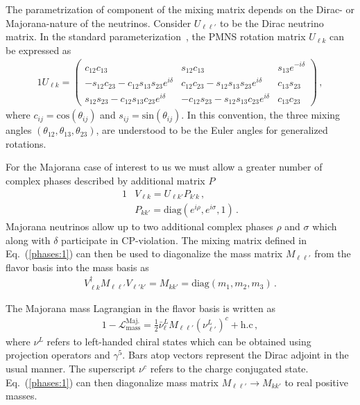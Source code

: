 \documentclass[addchapnum]{ws-rv961x669} %
\newcommand{\req}[1]{Eq.~(\ref{#1})}
\begin{document}
The parametrization of component of the mixing matrix depends on the Dirac- or Majorana-nature of the neutrinos.  Consider $U_{\ell\ell'}$ to be the Dirac  neutrino matrix. In the standard parameterization~\citep{Schwartz:2014sze}, the PMNS rotation matrix $U_{\ell k}$ can be expressed as
\begin{alignat}{1}
	\label{rotation:1} U_{\ell k} =
	  \begin{pmatrix}
		  c_{12}c_{13} & s_{12}c_{13} & s_{13}e^{-i\delta}\\
		  -s_{12}c_{23} - c_{12}s_{13}s_{23}e^{i\delta} & c_{12}c_{23} - s_{12}s_{13}s_{23}e^{i\delta} & c_{13}s_{23}\\
		  s_{12}s_{23} - c_{12}s_{13}c_{23}e^{i\delta}& -c_{12}s_{23} - s_{12}s_{13}c_{23}e^{i\delta} & c_{13}c_{23}
	  \end{pmatrix}\,,
\end{alignat}
where $c_{ij} = \mathrm{cos}(\theta_{ij})$ and $s_{ij} = \mathrm{sin}(\theta_{ij})$. In this convention, the three mixing angles $(\theta_{12}, \theta_{13}, \theta_{23})$, are understood to be the Euler angles for generalized rotations. 

For the Majorana case of interest to us we must allow a greater number of complex phases described by additional matrix $P$
\begin{alignat}{1}
	\label{phases:1} &V_{\ell k} = U_{\ell k'}P_{k'k}\,,\\
	\label{phases:3} &P_{kk'} = \mathrm{diag}(e^{i\rho},e^{i\sigma},1)\,.
\end{alignat}
Majorana neutrinos allow up to two additional complex phases $\rho$ and $\sigma$ which along with $\delta$ participate in CP-violation. The mixing matrix defined in \req{phases:1} can then be used to diagonalize the mass matrix $M_{\ell\ell'}$ from the flavor basis into the mass basis as
\begin{align}
    \label{diag:1}
    V_{\ell k}^{\dag}M_{\ell\ell'}V_{\ell'k'} = M_{kk'} = \mathrm{diag}(m_{1},m_{2},m_{3})\,.
\end{align}

The Majorana mass Lagrangian in the flavor basis is written as
\begin{alignat}{1}
	\label{mass:1} -\mathcal{L}_{\mathrm{mass}}^{\mathrm{Maj.}}=\frac{1}{2}\bar\nu_{\ell}^{L}M_{\ell\ell'}\left(\nu_{\ell'}^{L}\right)^{c}+\mathrm{h.c}\,,
\end{alignat}
where $\nu^{L}$ refers to left-handed chiral states which can be obtained using projection operators and $\gamma^{5}$. Bars atop vectors represent the Dirac adjoint in the usual manner. The superscript $\nu^{c}$ refers to the charge conjugated state. \req{phases:1} can then diagonalize mass matrix $M_{\ell\ell'}\rightarrow M_{kk'}$ to real positive masses.
\end{document}

